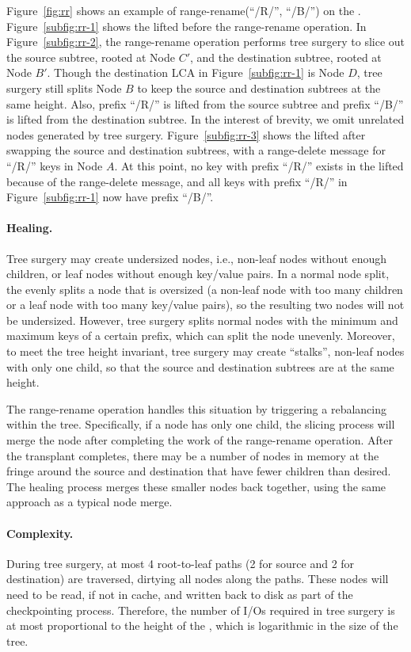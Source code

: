 Figure~\ref{fig:rr} shows an example of range-rename(``/R/'', ``/B/'') on the
\bet.
Figure~\ref{subfig:rr-1} shows the lifted \bet before the range-rename
operation.
In Figure~\ref{subfig:rr-2}, the range-rename operation performs tree surgery
to slice out the source subtree, rooted at Node $C'$,
and the destination subtree, rooted at Node $B'$.
Though the destination LCA in Figure~\ref{subfig:rr-1} is Node $D$,
tree surgery still splits Node $B$
to keep the source and destination subtrees at the same height.
Also, prefix ``/R/'' is lifted from the source subtree and prefix ``/B/''
is lifted from the destination subtree.
In the interest of brevity, we omit unrelated nodes generated by tree surgery.
Figure~\ref{subfig:rr-3} shows the lifted \bet after swapping the source and
destination subtrees, with a range-delete message for ``/R/'' keys in Node $A$.
At this point, no key with prefix ``/R/'' exists in the lifted \bet because of
the range-delete message, and all keys with prefix ``/R/'' in
Figure~\ref{subfig:rr-1} now have prefix ``/B/''.

\paragraph{Healing.}
Tree surgery may create undersized \bet nodes,
i.e., non-leaf nodes without enough children,
or leaf nodes without enough key/value pairs.
In a normal node split, the \bet evenly splits a node that is oversized
(a non-leaf node with too many children or
a leaf node with too many key/value pairs),
so the resulting two nodes will not be undersized.
However, tree surgery splits normal nodes with the minimum and maximum
keys of a certain prefix,
which can split the node unevenly.
Moreover, to meet the tree height invariant,
tree surgery may create ``stalks'', non-leaf nodes with only one child,
so that the source and destination subtrees are at the same height.

The range-rename operation handles this situation by
triggering a rebalancing within the tree.
Specifically, if a node has only one child, the slicing process will merge
the node after completing the work of the range-rename operation.
After the transplant completes, there may be a number of \bet nodes in memory at
the fringe around the source and destination that have fewer children than
desired.
The healing process merges these smaller nodes back together,
using the same approach as a typical \bet node merge.

\paragraph{Complexity.}
During tree surgery, at most 4 root-to-leaf paths
(2 for source and 2 for destination) are traversed, dirtying all
nodes along the paths.
These nodes will need to be read, if not in cache, and written back to disk as
part of the checkpointing process.
Therefore, the number of I/Os required in tree surgery is at most proportional
to the height of the \bet, which is logarithmic in the size of the tree.

